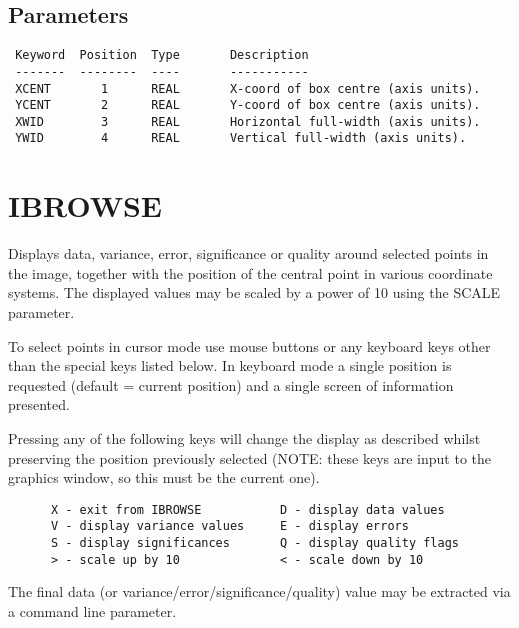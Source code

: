 \documentclass{book}
\renewcommand{\_}{{\tt\char'137}}     %
\begin{document}
\subsection{Parameters}
\begin{verbatim}
 Keyword  Position  Type       Description
 -------  --------  ----       -----------
 XCENT       1      REAL       X-coord of box centre (axis units).
 YCENT       2      REAL       Y-coord of box centre (axis units).
 XWID        3      REAL       Horizontal full-width (axis units).
 YWID        4      REAL       Vertical full-width (axis units).

\end{verbatim}\section{IBROWSE}
Displays data, variance, error, significance or quality around
selected points in the image, together with the position of
the central point in various coordinate systems. The displayed
values may be scaled by a power of 10 using the SCALE parameter.

To select points in cursor mode use mouse buttons or any keyboard
keys other than the special keys listed below. In keyboard mode a
single position is requested (default = current position) and a
single screen of information presented.

Pressing any of the following keys will change the display as
described whilst preserving the position previously selected
(NOTE: these keys are input to the graphics window, so this
must be the current one).

\begin{verbatim}
      X - exit from IBROWSE           D - display data values
      V - display variance values     E - display errors
      S - display significances       Q - display quality flags
      > - scale up by 10              < - scale down by 10
 \end{verbatim}
The final data (or variance/error/significance/quality) value may
be extracted via a command line parameter.
\end{document}
